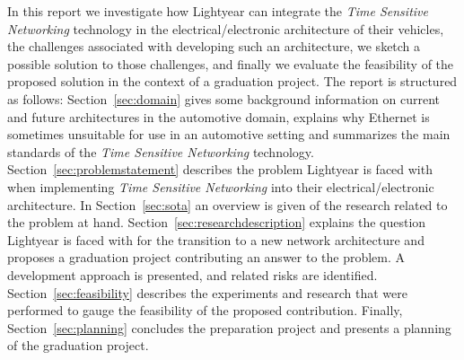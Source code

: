 In this report we investigate how Lightyear can integrate the \textit{Time Sensitive Networking} technology in the electrical/electronic architecture of their vehicles, the challenges associated with developing such an architecture, we sketch a possible solution to those challenges, and finally we evaluate the feasibility of the proposed solution in the context of a graduation project. The report is structured as follows: Section~\ref{sec:domain} gives some background information on current and future architectures in the automotive domain, explains why Ethernet is sometimes unsuitable for use in an automotive setting and summarizes the main standards of the \textit{Time Sensitive Networking} technology. Section~\ref{sec:problemstatement} describes the problem Lightyear is faced with when implementing \textit{Time Sensitive Networking} into their electrical/electronic architecture. In Section~\ref{sec:sota} an overview is given of the research related to the problem at hand. Section~\ref{sec:researchdescription} explains the question Lightyear is faced with for the transition to a new network architecture and proposes a graduation project contributing an answer to the problem. A development approach is presented, and related risks are identified. Section~\ref{sec:feasibility} describes the experiments and research that were performed to gauge the feasibility of the proposed contribution. Finally, Section~\ref{sec:planning} concludes the preparation project and presents a planning of the graduation project.